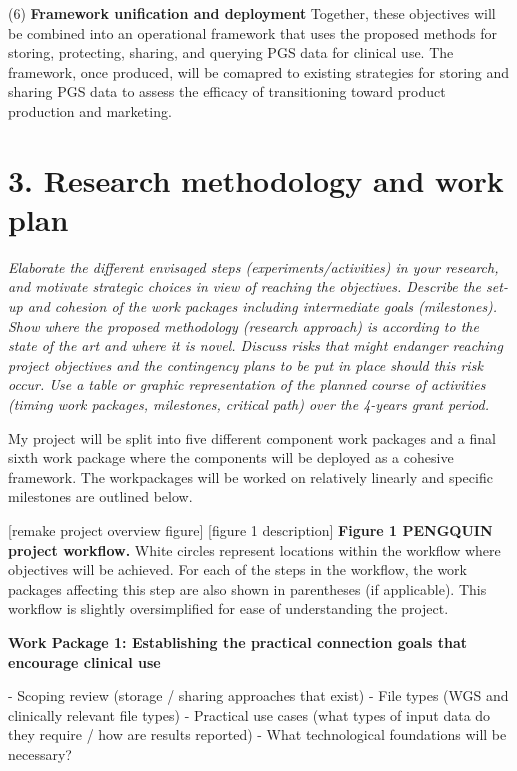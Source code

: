 \documentclass[11pt]{article}
\begin{document}


(6) \textbf{Framework unification and deployment}
Together, these objectives will be combined into an operational framework that uses the proposed methods for storing, protecting, sharing, and querying PGS data for clinical use. The framework, once produced, will be comapred to existing strategies for storing and sharing PGS data to assess the efficacy of transitioning toward product production and marketing.


\section{3. Research methodology and work plan}
\textit{Elaborate the different envisaged steps (experiments/activities) in your research, and motivate strategic choices in view of reaching the objectives. Describe the set-up and cohesion of the work packages including intermediate goals (milestones).
Show where the proposed methodology (research approach) is according to the state of the art and where it is novel. Discuss risks that might endanger reaching project objectives and the contingency plans to be put in place should this risk occur.
Use a table or graphic representation of the planned course of activities (timing work packages, milestones, critical path) over the 4-years grant period.}

My project will be split into five different component work packages and a final sixth work package where the components will be deployed as a cohesive framework. The workpackages will be worked on relatively linearly and specific milestones are outlined below.


[remake project overview figure]
[figure 1 description]
\textbf{Figure 1 PENGQUIN project workflow.} 
White circles represent locations within the workflow where objectives will be achieved. 
For each of the steps in the workflow, the work packages affecting this step are also shown in parentheses (if applicable). 
This workflow is slightly oversimplified for ease of understanding the project.


\textbf{Work Package 1: Establishing the practical connection goals that encourage clinical use}

- Scoping review (storage / sharing approaches that exist)
- File types (WGS and clinically relevant file types)
- Practical use cases (what types of input data do they require / how are results reported)
- What technological foundations will be necessary?
\end{document}
